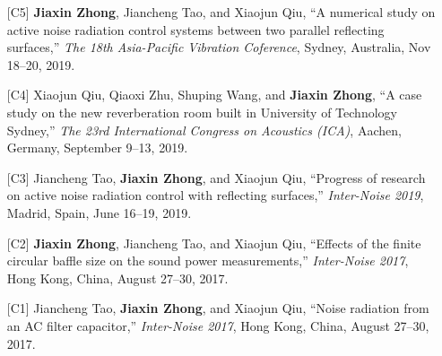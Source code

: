 \documentclass[10pt,a4paper,ragged2e,withhyper]{altacv}
\newcommand{\PubConference}[1]{\textit{#1}}
\newcommand{\PubTitle}[1]{``{#1,}''}
\newcommand{\PubMe}[1]{\textbf{#1}}
\begin{document}
\begin{itemize}[leftmargin = 30pt]
          \item[{[C5]}] \PubMe{Jiaxin Zhong}, Jiancheng Tao, and Xiaojun Qiu,
          \PubTitle{A numerical study on active noise radiation control systems between two parallel reflecting surfaces}
          \PubConference{The 18th Asia-Pacific Vibration Coference},
          Sydney, Australia,
          Nov 18--20, 2019.
          \href{https://github.com/JiaxinZhong/JiaxinZhong.github.io/raw/master/publications/conference/Zhong2019-APVC-ANC_parallel_surface.pdf}{\color{accent}\faFilePdf[regular]}

          \item[{[C4]}] Xiaojun Qiu, Qiaoxi Zhu, Shuping Wang, and \PubMe{Jiaxin Zhong},
          \PubTitle{A case study on the new reverberation room built in University of Technology Sydney}
          \PubConference{The 23rd International Congress on Acoustics (ICA)},
          Aachen, Germany,
          September 9--13, 2019.
          \href{https://github.com/JiaxinZhong/JiaxinZhong.github.io/raw/master/publications/conference/Qiu2019-ICA-Reverberation_room_UTS.pdf}{\color{accent}\faFilePdf[regular]}

          \item[{[C3]}] Jiancheng Tao, \PubMe{Jiaxin Zhong}, and Xiaojun Qiu,
          \PubTitle{Progress of research on active noise radiation control with reflecting surfaces}
          \PubConference{Inter-Noise 2019},
          Madrid, Spain,
          June 16--19, 2019.
          \href{https://github.com/JiaxinZhong/JiaxinZhong.github.io/raw/master/publications/conference/Tao2019-Internoise-ANC_surface.pdf}{\color{accent}\faFilePdf[regular]}

          \item[{[C2]}] \PubMe{Jiaxin Zhong}, Jiancheng Tao, and Xiaojun Qiu,
          \PubTitle{Effects of the finite circular baffle size on the sound power measurements}
          \PubConference{Inter-Noise 2017},
          Hong Kong, China,
          August 27--30, 2017.
          \href{https://github.com/JiaxinZhong/JiaxinZhong.github.io/raw/master/publications/conference/Zhong2017-InterNoise-Sound_power_measurement.pdf}{\color{accent}\faFilePdf[regular]}

          \item[{[C1]}] Jiancheng Tao, \PubMe{Jiaxin Zhong}, and Xiaojun Qiu,
          \PubTitle{Noise radiation from an AC filter capacitor}
          \PubConference{Inter-Noise 2017},
          Hong Kong, China,
          August 27--30, 2017.
          \href{https://github.com/JiaxinZhong/JiaxinZhong.github.io/raw/master/publications/conference/Tao2017-Internoise-AC_capacitor.pdf}{\color{accent}\faFilePdf[regular]}
\end{itemize}
\end{document}
